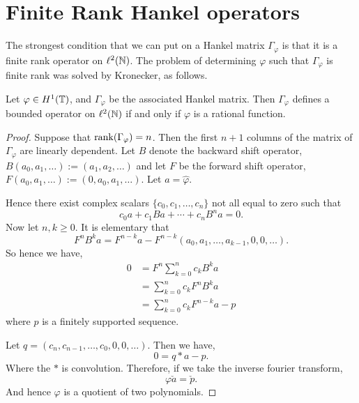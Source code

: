 \documentclass{unswmaths}
\begin{document}
\section{Finite Rank Hankel operators}
The strongest condition that we can put on a Hankel matrix $\Gamma_\varphi$
is that it is a finite rank operator on $\ell^2(\mathbb{N})$. The problem
of determining $\varphi$ such that $\Gamma_\varphi$ is finite rank
was solved by Kronecker, as follows.
\begin{theorem}
\label{kronecker}
    Let $\varphi \in H^1(\mathbb{T})$, and $\Gamma_\varphi$ be the associated Hankel
    matrix. Then $\Gamma_\varphi$ defines a bounded operator on $\ell^2(\mathbb{N})$
    if and only if $\varphi$ is a rational function.
\end{theorem}
\begin{proof}
    Suppose that $\operatorname{rank}(\Gamma_\varphi) = n$. Then the first $n+1$
    columns of the matrix of $\Gamma_\varphi$ are linearly dependent. Let $B$
    denote the backward shift operator, $B(a_0,a_1,\ldots) := (a_1,a_2,\ldots)$
    and let $F$ be the forward shift operator, $F(a_0,a_1,\ldots) := (0,a_0,a_1,\ldots)$.
    Let $a = \hat{\varphi}$.
    
    Hence there exist complex scalars $\{c_0,c_1,\ldots,c_n\}$ not all
    equal to zero such that
    \begin{equation*}
        c_0a+c_1Ba+\cdots+c_nB^na = 0.
    \end{equation*}
    Now let $n,k \geq 0$. It is elementary that
    \begin{equation*}
        F^n B^k a = F^{n-k}a-F^{n-k}(a_0,a_1,\ldots,a_{k-1},0,0,\ldots).
    \end{equation*}
    So hence we have,
    \begin{align*}
        0 &= F^n\sum_{k=0}^n c_k B^ka \\
          &= \sum_{k=0}^n c_kF^n B^ka\\
          &= \sum_{k=0}^n c_kF^{n-k}a - p
    \end{align*}
    where $p$ is a finitely supported sequence. 
    
    Let $q = (c_n,c_{n-1},\ldots,c_0,0,0,\ldots)$. Then we have,
    \begin{equation*}
        0 = q * a - p.
    \end{equation*}
    Where the $*$ is convolution. Therefore, if we take the inverse fourier transform,
    \begin{equation*}
        \varphi\check{a} = \check{p}.
    \end{equation*}
    And hence $\varphi$ is a quotient of two polynomials.
    

\end{proof}
\end{document}
